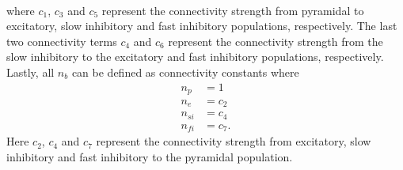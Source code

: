 \begin{align}
\end{align} where $c_{1}$, $c_{3}$ and $c_{5}$ represent the connectivity strength from pyramidal to excitatory, slow inhibitory and fast inhibitory populations, respectively. The last two connectivity terms $c_{4}$ and $c_{6}$ represent the connectivity strength from the slow inhibitory to the excitatory and fast inhibitory populations, respectively. Lastly, all $n_{b}$ can be defined as connectivity constants where\begin{align}%
n_{p} &=1\\
n_{e} &=c_{2}\\
n_{si} &=c_{4}\\
n_{fi} &=c_{7}.
\end{align} Here $c_{2}$, $c_4$ and $c_7$ represent the connectivity strength from excitatory, slow inhibitory and fast inhibitory to the pyramidal population.


